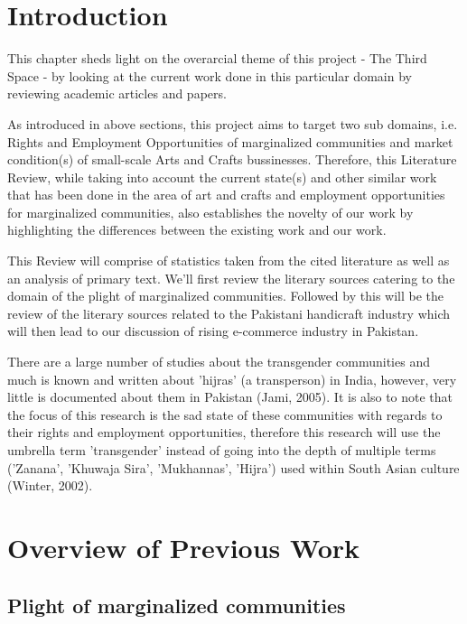 

\section{Introduction}

This chapter sheds light on the overarcial theme of this project - The Third Space - by looking at the current work done in this particular domain by reviewing academic articles and papers.

As introduced in above sections, this project aims to target two sub domains, i.e. Rights and Employment Opportunities of marginalized communities and market condition(s) of small-scale Arts and Crafts bussinesses. Therefore, this Literature Review, while taking into account the current state(s) and other similar work that has been done in the area of art and crafts and employment opportunities for marginalized communities, also establishes the novelty of our work by highlighting the differences between the existing work and our work.

This Review will comprise of statistics taken from the cited literature as well as an analysis of primary text. We'll first review the literary sources catering to the domain of the plight of marginalized communities. Followed by this will be the review of the literary sources related to the Pakistani handicraft industry which will then lead to our discussion of rising e-commerce industry in Pakistan.

There are a large number of studies about the transgender communities and much is known and written about 'hijras' (a transperson) in India, however, very little is documented about them in Pakistan (Jami, 2005). It is also to note that the focus of this research is the sad state of these communities with regards to their rights and employment opportunities, therefore this research will use the umbrella term 'transgender' instead of going into the depth of multiple terms ('Zanana', 'Khuwaja Sira', 'Mukhannas', 'Hijra') used within South Asian culture (Winter, 2002). 

\section{Overview of Previous Work}

\subsection{Plight of marginalized communities}

